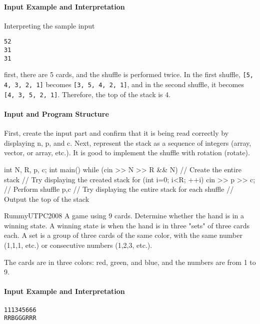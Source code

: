 \paragraph{Input Example and Interpretation}

Interpreting the sample input
\begin{alltt}
5 2
3 1
3 1
\end{alltt}
first, there are 5 cards, and the shuffle is performed twice.
In the first shuffle, \texttt{[5, 4, 3, 2, 1]} becomes \texttt{[3, 5, 4, 2, 1]}, and
in the second shuffle, it becomes \texttt{[4, 3, 5, 2, 1]}. Therefore, the top of the stack is 4.

\paragraph{Input and Program Structure}

First, create the input part and confirm that it is being read correctly by displaying n, p, and c. Next, represent the stack as a sequence of integers (array, vector, or array, etc.).
It is good to implement the shuffle with rotation (rotate).

\begin{cbox}
int N, R, p, c;
int main() {
    while (cin >> N >> R && N) {
        // Create the entire stack
        // Try displaying the created stack
        for (int i=0; i<R; ++i) {
            cin >> p >> c;
            // Perform shuffle p,c
            // Try displaying the entire stack for each shuffle
        }
        // Output the top of the stack
    }
}
\end{cbox}



\begin{pbox}{Rummy}{UTPC2008}
A game using 9 cards. Determine whether the hand is in a winning state.
A winning state is when the hand is in three "sets" of three cards each. A set is
a group of three cards of the same color, with the same number (1,1,1, etc.) or consecutive numbers (1,2,3, etc.).

The cards are in three colors: red, green, and blue, and the numbers are from 1 to 9.
  
\end{pbox}


\paragraph{Input Example and Interpretation}
\begin{alltt}
1 1 1 3 4 5 6 6 6
R R B G G G R R R
\end{alltt}

